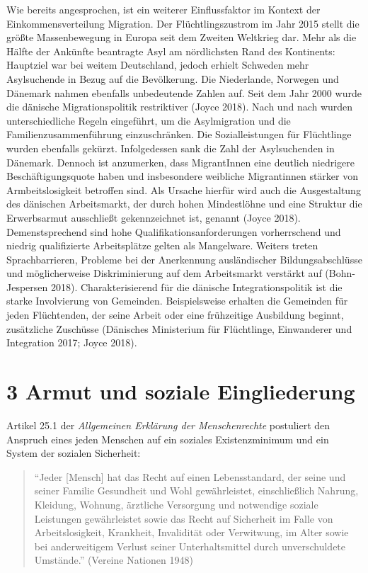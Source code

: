 \documentclass[12pt,]{article}
\begin{document}
Wie bereits angesprochen, ist ein weiterer Einflussfaktor im Kontext der
Einkommensverteilung Migration. Der Flüchtlingszustrom im Jahr 2015
stellt die größte Massenbewegung in Europa seit dem Zweiten Weltkrieg
dar. Mehr als die Hälfte der Ankünfte beantragte Asyl am nördlichsten
Rand des Kontinents: Hauptziel war bei weitem Deutschland, jedoch
erhielt Schweden mehr Asylsuchende in Bezug auf die Bevölkerung. Die
Niederlande, Norwegen und Dänemark nahmen ebenfalls unbedeutende Zahlen
auf. Seit dem Jahr 2000 wurde die dänische Migrationspolitik
restriktiver (Joyce 2018). Nach und nach wurden unterschiedliche Regeln
eingeführt, um die Asylmigration und die Familienzusammenführung
einzuschränken. Die Sozialleistungen für Flüchtlinge wurden ebenfalls
gekürzt. Infolgedessen sank die Zahl der Asylsuchenden in Dänemark.
Dennoch ist anzumerken, dass MigrantInnen eine deutlich niedrigere
Beschäftigungsquote haben und insbesondere weibliche Migrantinnen
stärker von Armbeitslosigkeit betroffen sind. Als Ursache hierfür wird
auch die Ausgestaltung des dänischen Arbeitsmarkt, der durch hohen
Mindestlöhne und eine Struktur die Erwerbsarmut ausschließt
gekennzeichnet ist, genannt (Joyce 2018). Demenstsprechend sind hohe
Qualifikationsanforderungen vorherrschend und niedrig qualifizierte
Arbeitsplätze gelten als Mangelware. Weiters treten Sprachbarrieren,
Probleme bei der Anerkennung ausländischer Bildungsabschlüsse und
möglicherweise Diskriminierung auf dem Arbeitsmarkt verstärkt auf
(Bohn-Jespersen 2018). Charakterisierend für die dänische
Integrationspolitik ist die starke Involvierung von Gemeinden.
Beispielsweise erhalten die Gemeinden für jeden Flüchtenden, der seine
Arbeit oder eine frühzeitige Ausbildung beginnt, zusätzliche Zuschüsse
(Dänisches Ministerium für Flüchtlinge, Einwanderer und Integration
2017; Joyce 2018).

\section{3 Armut und soziale
Eingliederung}\label{armut-und-soziale-eingliederung}

Artikel 25.1 der \emph{Allgemeinen Erklärung der Menschenrechte}
postuliert den Anspruch eines jeden Menschen auf ein soziales
Existenzminimum und ein System der sozialen Sicherheit:

\begin{quote}
``Jeder {[}Mensch{]} hat das Recht auf einen Lebensstandard, der seine
und seiner Familie Gesundheit und Wohl gewährleistet, einschließlich
Nahrung, Kleidung, Wohnung, ärztliche Versorgung und notwendige soziale
Leistungen gewährleistet sowie das Recht auf Sicherheit im Falle von
Arbeitslosigkeit, Krankheit, Invalidität oder Verwitwung, im Alter sowie
bei anderweitigem Verlust seiner Unterhaltsmittel durch unverschuldete
Umstände.'' (Vereine Nationen 1948)
\end{quote}
\end{document}
